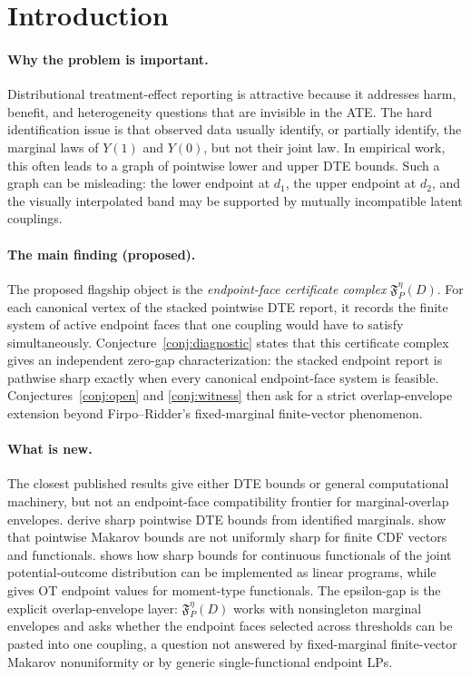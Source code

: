 \documentclass[11pt]{article}
\theoremstyle{definition}
\theoremstyle{plain}
\theoremstyle{remark}
\begin{document}
\section{Introduction}
\paragraph{Why the problem is important.}
Distributional treatment-effect reporting is attractive because it addresses harm,
benefit, and heterogeneity questions that are invisible in the ATE.  The hard
identification issue is that observed data usually identify, or partially identify,
the marginal laws of \(Y(1)\) and \(Y(0)\), but not their joint law.  In empirical
work, this often leads to a graph of pointwise lower and upper DTE bounds.  Such a
graph can be misleading: the lower endpoint at \(d_1\), the upper endpoint at
\(d_2\), and the visually interpolated band may be supported by mutually
incompatible latent couplings.

\paragraph{The main finding (proposed).}
The proposed flagship object is the \emph{endpoint-face certificate complex}
\(\mathfrak F^\eta_P(D)\).  For each canonical vertex of the stacked pointwise
DTE report, it records the finite system of active endpoint faces that one
coupling would have to satisfy simultaneously.  Conjecture~\ref{conj:diagnostic}
states that this certificate complex gives an independent zero-gap
characterization: the stacked endpoint report is pathwise sharp exactly when
every canonical endpoint-face system is feasible.  Conjectures~\ref{conj:open}
and \ref{conj:witness} then ask for a strict overlap-envelope extension beyond
Firpo--Ridder's fixed-marginal finite-vector phenomenon.

\paragraph{What is new.}
The closest published results give either DTE bounds or general computational
machinery, but not an endpoint-face compatibility frontier for marginal-overlap
envelopes.  \citet[Section 2 and Lemma 2.3]{FanPark2010} derive sharp pointwise
DTE bounds from identified marginals.  \citet[Section 2]{FirpoRidder2019} show
that pointwise Makarov bounds are not uniformly sharp for finite CDF vectors and
functionals.  \citet[Supplementary Appendix 3, especially the
finite-dimensional implementation discussion]{Russell2021} shows how sharp
bounds for continuous functionals of the joint potential-outcome distribution can
be implemented as linear programs, while \citet[Sections 2--3, where endpoint
bounds are OT values]{OberReynolds2023} gives OT endpoint values for moment-type
functionals.  The epsilon-gap is the explicit overlap-envelope layer:
\(\mathfrak F^\eta_P(D)\) works with nonsingleton marginal envelopes and asks
whether the endpoint faces selected across thresholds can be pasted into one
coupling, a question not answered by fixed-marginal finite-vector Makarov
nonuniformity or by generic single-functional endpoint LPs.
\end{document}

